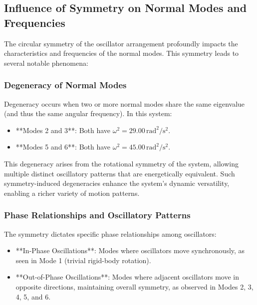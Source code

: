 \documentclass[12pt]{report} %
\begin{document}
\subsection{Influence of Symmetry on Normal Modes and Frequencies}
\label{subsec:part4_symmetry_influence}

The circular symmetry of the oscillator arrangement profoundly impacts the characteristics and frequencies of the normal modes. This symmetry leads to several notable phenomena:

\subsubsection{Degeneracy of Normal Modes}
\label{subsubsec:part4_degeneracy}

Degeneracy occurs when two or more normal modes share the same eigenvalue (and thus the same angular frequency). In this system:

\begin{itemize}
    \item **Modes 2 and 3**: Both have \( \omega^2 = 29.00 \, \text{rad}^2/\text{s}^2 \).
    \item **Modes 5 and 6**: Both have \( \omega^2 = 45.00 \, \text{rad}^2/\text{s}^2 \).
\end{itemize}

This degeneracy arises from the rotational symmetry of the system, allowing multiple distinct oscillatory patterns that are energetically equivalent. Such symmetry-induced degeneracies enhance the system's dynamic versatility, enabling a richer variety of motion patterns.

\subsubsection{Phase Relationships and Oscillatory Patterns}
\label{subsubsec:part4_phase_relationships}

The symmetry dictates specific phase relationships among oscillators:

\begin{itemize}
    \item **In-Phase Oscillations**: Modes where oscillators move synchronously, as seen in Mode 1 (trivial rigid-body rotation).
    \item **Out-of-Phase Oscillations**: Modes where adjacent oscillators move in opposite directions, maintaining overall symmetry, as observed in Modes 2, 3, 4, 5, and 6.
\end{itemize}
\end{document}

